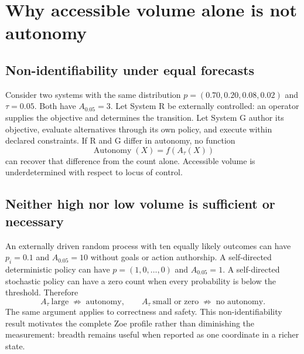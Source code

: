 \section{Why accessible volume alone is not autonomy}
\subsection{Non-identifiability under equal forecasts}
Consider two systems with the same distribution $p=(0.70,0.20,0.08,0.02)$ and $\tau=0.05$. Both have $A_{0.05}=3$. Let System R be externally controlled: an operator supplies the objective and determines the transition. Let System G author its objective, evaluate alternatives through its own policy, and execute within declared constraints. If R and G differ in autonomy, no function
\begin{equation}
\operatorname{Autonomy}(X)=f\!\left(A_\tau(X)\right)
\label{eq:no-volume-only-autonomy}
\end{equation}
can recover that difference from the count alone. Accessible volume is underdetermined with respect to locus of control.

\subsection{Neither high nor low volume is sufficient or necessary}
An externally driven random process with ten equally likely outcomes can have
$p_i=0.1$ and $A_{0.05}=10$ without goals or action authorship. A self-directed deterministic policy can have $p=(1,0,\ldots,0)$ and $A_{0.05}=1$. A self-directed stochastic policy can have a zero count when every probability is below the threshold. Therefore
\begin{equation}
A_\tau\ \text{large}\;\not\Rightarrow\;\text{autonomy},\qquad
A_\tau\ \text{small or zero}\;\not\Rightarrow\;\text{no autonomy}.
\label{eq:autonomy-counterexamples}
\end{equation}
The same argument applies to correctness and safety. This non-identifiability result motivates the complete Zoe profile rather than diminishing the measurement: breadth remains useful when reported as one coordinate in a richer state.

